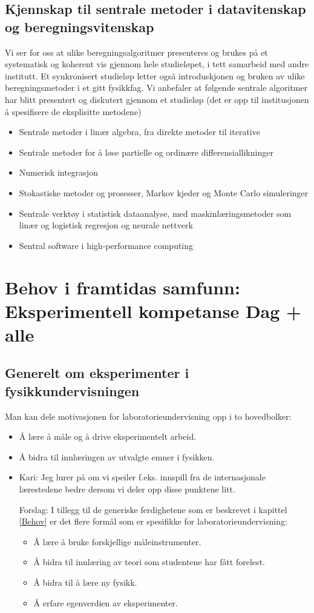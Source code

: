 \documentclass{article}
\begin{document}
\subsection{Kjennskap til sentrale metoder i datavitenskap og beregningsvitenskap}
Vi ser for oss at ulike beregningsalgoritmer presenteres og brukes på et systematisk og koherent vis gjennom hele studieløpet, i tett samarbeid med andre institutt. Et synkronisert studieløp letter også introduskjonen og bruken av ulike beregningsmetoder i et gitt fysikkfag. 
Vi anbefaler at følgende sentrale algoritmer har blitt presentert og diskutert gjennom et studieløp (det er opp til institusjonen å spesifisere de eksplisitte metodene)
\begin{itemize}
  \item Sentrale metoder i linær algebra, fra direkte metoder til iterative
  \item Sentrale metoder for å løse partielle og ordinære differensiallikninger
  \item Numerisk integrasjon
  \item Stokastiske metoder og prosesser, Markov kjeder og Monte Carlo simuleringer 
  \item Sentrale verktøy i statistisk dataanalyse, med maskinlæringsmetoder som linær og logistisk regresjon og neurale nettverk
  \item Sentral software i high-performance computing 
\end{itemize}

\section{Behov i framtidas samfunn: Eksperimentell kompetanse {\color{red} Dag + alle}}

\subsection{Generelt om eksperimenter i fysikkundervisningen}
Man kan dele motivasjonen for laboratorieundervisning opp i to hovedbolker:
\begin{itemize}
    \item Å lære å måle og å drive eksperimentelt arbeid.
    \item Å bidra til innlæringen av utvalgte emner i
    fysikken.
    \item {\color{red}Kari: Jeg lurer på om vi speiler f.eks. innspill fra de internasjonale lærestedene bedre dersom vi deler opp disse punktene litt. 
    
    Forslag:
    I tillegg til de generiske ferdighetene som er beskrevet i kapittel \ref{Behov} er det flere formål som er spesifikke for laboratorieundervisning:  
    \begin{itemize}
    \item Å lære å bruke forskjellige måleinstrumenter.
    \item Å bidra til innlæring av teori som studentene har fått forelest. 
    \item Å bidra til å lære ny fysikk.
    \item Å erfare egenverdien av eksperimenter.
    \end{itemize}}
\end{itemize}
\end{document}

